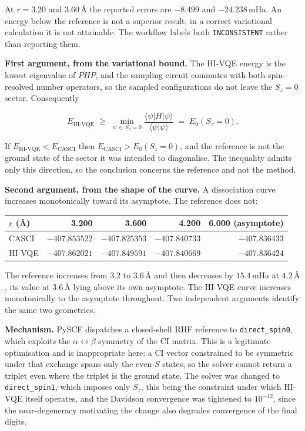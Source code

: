 \documentclass[11pt,a4paper]{article}
\newcommand{\mHa}{\ensuremath{\,\mathrm{mHa}}}
\newcommand{\Ang}{\ensuremath{\,\text{\AA}}}
\newcommand{\code}[1]{\texttt{\small #1}}
\begin{document}
At $r = 3.20$ and $3.60\Ang$ the reported errors are $-8.499$ and
$-24.238\mHa$. An energy below the reference is not a superior result; in a
correct variational calculation it is not attainable. The workflow labels both
\code{INCONSISTENT} rather than reporting them.

\textbf{First argument, from the variational bound.} The HI-VQE energy is the
lowest eigenvalue of $PHP$, and the sampling circuit commutes with both
spin-resolved number operators, so the sampled configurations do not leave the
$S_z = 0$ sector. Consequently

\[
E_{\text{HI-VQE}} \;\geq\; \min_{\psi \,\in\, S_z = 0}
\frac{\langle \psi | H | \psi \rangle}{\langle \psi | \psi \rangle}
\;=\; E_0(S_z = 0).
\]

If $E_{\text{HI-VQE}} < E_{\text{CASCI}}$ then $E_{\text{CASCI}} > E_0(S_z=0)$,
and the reference is not the ground state of the sector it was intended to
diagonalise. The inequality admits only this direction, so the conclusion
concerns the reference and not the method.

\textbf{Second argument, from the shape of the curve.} A dissociation curve
increases monotonically toward its asymptote. The reference does not:

\begin{center}
\small
\begin{tabular}{@{}lrrrr@{}}
\toprule
$r$ (\AA) & 3.200 & 3.600 & 4.200 & 6.000 (asymptote) \\
\midrule
CASCI  & $-407.853522$ & $-407.825353$ & $-407.840733$ & $-407.836433$ \\
HI-VQE & $-407.862021$ & $-407.849591$ & $-407.840669$ & $-407.836424$ \\
\bottomrule
\end{tabular}
\end{center}

The reference increases from $3.2$ to $3.6\Ang$ and then decreases by
$15.4\mHa$ at $4.2\Ang$, its value at $3.6\Ang$ lying above its own asymptote.
The HI-VQE curve increases monotonically to the asymptote throughout. Two
independent arguments identify the same two geometries.

\textbf{Mechanism.} PySCF dispatches a closed-shell RHF reference to
\code{direct\_spin0}, which exploits the $\alpha \leftrightarrow \beta$
symmetry of the CI matrix. This is a legitimate optimisation and is
inappropriate here: a CI vector constrained to be symmetric under that exchange
spans only the even-$S$ states, so the solver cannot return a triplet even
where the triplet is the ground state. The solver was changed to
\code{direct\_spin1}, which imposes only $S_z$, this being the constraint under
which HI-VQE itself operates, and the Davidson convergence was tightened to
$10^{-12}$, since the near-degeneracy motivating the change also degrades
convergence of the final digits.
\end{document}
